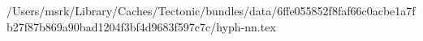 /Users/msrk/Library/Caches/Tectonic/bundles/data/6ffe055852f8faf66c0acbe1a7fb27f87b869a90bad1204f3bf4d9683f597c7c/hyph-nn.tex
